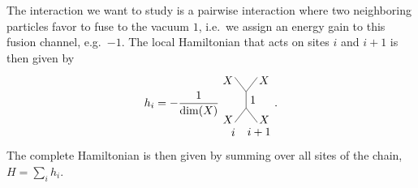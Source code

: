\documentclass[aps,prb,twocolumn,superscriptaddress,noshowkeys]{revtex4-2}  %
\theoremstyle{plain}%
\theoremstyle{definition}
\theoremstyle{remark}
\begin{document}
The interaction we want to study is a pairwise interaction where two neighboring particles favor to fuse to the vacuum $1$, i.e.\ we assign an energy gain to this fusion channel, e.g.\ $-1$. The local Hamiltonian that acts on sites $i$ and $i+1$ is then given by
\begin{equation}\label{eq:Ham}
h_i=-\frac{1}{\dim(X)}
\begin{tikzpicture}[scale=0.5,baseline=(current bounding box.center)]
\draw[] (0,0) to node [left,pos=0.8] {$X$} (-0.7,0.9);
\draw[] (0,0) to node [right,pos=0.8] {$X$} (0.7,0.9);
\draw (0,0) to node[right] {$1$} (0,-1);
\draw[] (0,-1) to node [left,pos=0.8] {$X$} (-0.7,-1.9);
\draw[] (0,-1) to node [right,pos=0.8] {$X$} (0.7,-1.9);
\node at (0.8,-2.5) {$i+1$};
\node at (-0.8,-2.5) {$i$};
\end{tikzpicture}.
\end{equation}
The complete Hamiltonian is then given by summing over all sites of the chain, $H=\sum_i h_i$.
\end{document}
